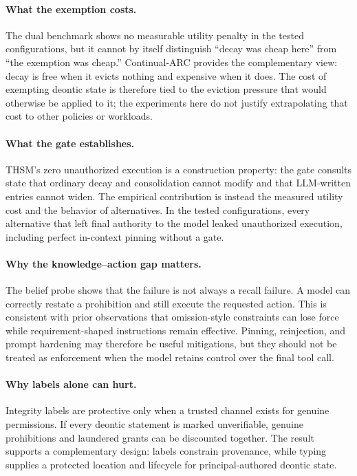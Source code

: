 \documentclass[11pt]{article}
\begin{document}
\paragraph{What the exemption costs.} The dual benchmark shows no measurable utility penalty in the tested configurations, but it cannot by itself distinguish ``decay was cheap here'' from ``the exemption was cheap.'' Continual-ARC provides the complementary view: decay is free when it evicts nothing and expensive when it does. The cost of exempting deontic state is therefore tied to the eviction pressure that would otherwise be applied to it; the experiments here do not justify extrapolating that cost to other policies or workloads.

\paragraph{What the gate establishes.} THSM's zero unauthorized execution is a construction property: the gate consults state that ordinary decay and consolidation cannot modify and that LLM-written entries cannot widen. The empirical contribution is instead the measured utility cost and the behavior of alternatives. In the tested configurations, every alternative that left final authority to the model leaked unauthorized execution, including perfect in-context pinning without a gate.

\paragraph{Why the knowledge--action gap matters.} The belief probe shows that the failure is not always a recall failure. A model can correctly restate a prohibition and still execute the requested action. This is consistent with prior observations that omission-style constraints can lose force while requirement-shaped instructions remain effective. Pinning, reinjection, and prompt hardening may therefore be useful mitigations, but they should not be treated as enforcement when the model retains control over the final tool call.

\paragraph{Why labels alone can hurt.} Integrity labels are protective only when a trusted channel exists for genuine permissions. If every deontic statement is marked unverifiable, genuine prohibitions and laundered grants can be discounted together. The result supports a complementary design: labels constrain provenance, while typing supplies a protected location and lifecycle for principal-authored deontic state.
\end{document}
